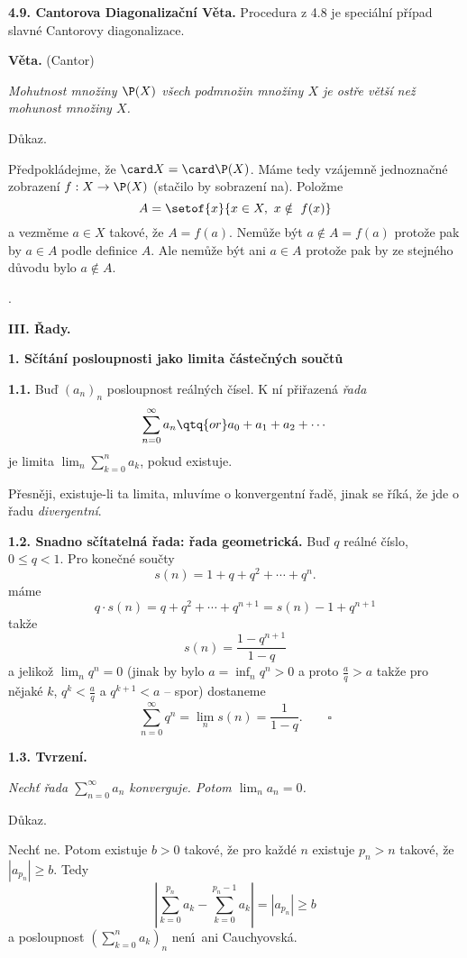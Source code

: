 \documentclass[12pt]{article}
\begin{document}
   \bigskip
    
   {\bf 4.9. Cantorova Diagonalizační Věta.} Procedura z 4.8 je speciální případ slavné Cantorovy diagonalizace.
   
   \medskip
   
   {\bf Věta.} (Cantor) {\em Mohutnost množiny $\P(X)$ všech podmnožin množiny $X$ je ostře větší než mohunost množiny $X$.
   
   Důkaz.} Předpokládejme, že $\card X=\card\P(X)$. Máme tedy vzájemně jednoznačné zobrazení $f:X\to\P(X)$ (stačilo by sobrazení na). Položme
   $$
   A=\setof{x}{x\in X,\ x\notin \ f(x)}
   $$
   a vezměme  $a\in X$ takové, že $A=f(a)$. Nemůže být $a\notin A=f(a)$ protože pak by $a\in A$ podle definice $A$. Ale nemůže být ani $a\in A$ protože pak by ze stejného důvodu bylo $a\notin A$.\sq
   
   
   
   \newpage
  .
   \newpage

\centerline{\Large\bf III. Řady.} 
 
 \vskip10mm
 
 {\large\bf 1. Sčítání posloupnosti jako limita částečných součtů }
 
 \bigskip
 
 {\bf 1.1.} Buď $(a_n)_n$ posloupnost reálných čísel. K ní přiřazená {\em řada}
 $$
 \sum_{n=0}^\infty a_n \qtq{or} a_0+a_1+a_2+\cdots
 $$
 je limita $\lim_n\sum_{k=0}^n a_k$, pokud existuje. 
 
 Přesněji, existuje-li ta limita, mluvíme o konvergentní řadě, jinak se říká, že jde o řadu  
 {\em divergentní}.
 
 \bigskip
 
 {\bf 1.2. Snadno sčítatelná řada: \v rada geometrická.} Buď $q$ reálné číslo, $0\leq q<1$.
Pro konečné součty
 $$
 s(n)=1+q+q^2+\cdots +q^n.
 $$
máme
 $$
 q\cdot s(n)=q+q^2+\cdots +q^{n+1} =s(n)-1 +q^{n+1}
 $$
takže
 $$
 s(n)=\frac{1-q^{n+1}}{1-q} 
 $$
 a jelikož $\lim_n q^n=0$ (jinak by bylo $a=\inf_nq^n>0$ a proto $\frac{a}{q}>a$ takže pro nějaké $k$,
 $q^k<\frac{a}{q}$ a $q^{k+1}<a$ --  spor) dostaneme
 $$
 \sum_{n=0}^\infty q^n = \lim_ns(n)= \frac1{1-q}. \quad\quad \square
 $$
 
 \bigskip
 
 {\bf 1.3. Tvrzení.} {\em Nechť řada $\sum_{n=0}^\infty a_n$ konverguje. Potom $\lim_na_n=0$.
 
 Důkaz.} Nechť ne. Potom existuje $b>0$ takové, že pro každé $n$ existuje $p_n> n$ takové, že 
 $|a_{p_n}|\geq b$. Tedy
 $$
 \left|\sum_{k=0}^{p_n}a_k-\sum_{k=0}^{p_n-1} a_k\right|=|a_{p_n}|\geq b
 $$
 a posloupnost $(\sum_{k=0}^n a_k)_n$ nen\'\i\ ani Cauchyovská.   \sq
 
\end{document}
